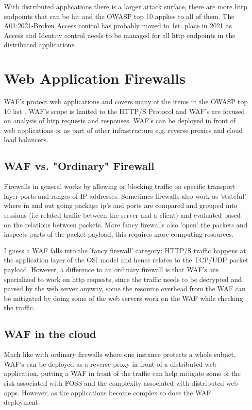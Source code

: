 \documentclass[
	letterpaper, %
	10pt, %
	unnumberedsections, %
	twoside, %
]{APAAssignment}
\begin{document}
With distributed applications there is a larger attack surface, there are more http endpoints that can be hit and the OWASP top 10 applies to all of them. The A01:2021-Broken Access control \cite{OWASPtop10} has probably moved to 1st. place in 2021 as Access and Identity control needs to be managed for all http endpoints in the distributed applications.       

\section{Web Application Firewalls}
WAF's protect web applications and covers many of the items in the OWASP top 10 list \cite{OWASPtop10}. WAF's scope is limited to the HTTP/S Protocol and WAF's are focused on analysis of http requests and responses. WAF's can be deployed in front of web applications or as part of other infrastructure e.g. reverse proxies and cloud load balancers.   

\subsection{WAF vs. "Ordinary" Firewall}
Firewalls in general works by allowing or blocking traffic on specific transport layer ports and ranges of IP addresses. Sometimes firewalls also work as 'stateful' where in and out going package ip's and ports are compared and grouped into sessions (i.e related traffic between the server and a client) and evaluated based on the relations between packets. More fancy firewalls also 'open' the packets and inspects parts of the packet payload, this requires more computing resources. 

I guess a WAF falls into the 'fancy firewall' category: HTTP/S traffic happens at the application layer of the OSI model and hence relates to the TCP/UDP packet payload. However, a difference to an ordinary firewall is that WAF's are specialized to work on http requests, since the traffic needs to be decrypted and parsed by the web server anyway, some the resource overhead from the WAF can be mitigated by doing some of the web servers work on the WAF while checking the traffic.    

\subsection{WAF in the cloud}
Much like with ordinary firewalls where one instance protects a whole subnet, WAF's can be deployed as a reverse proxy in front of a distributed web application, putting a WAF in front of the traffic can help mitigate some of the risk associated with FOSS and the complexity associated with distributed web apps. However, as the applications become complex so does the WAF deployment. 
\end{document}
